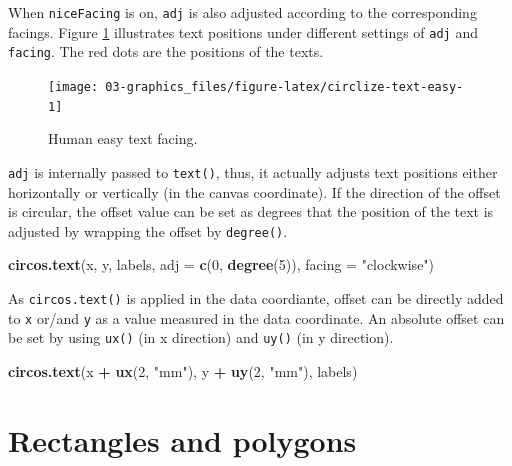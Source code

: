 \documentclass[]{book}
\newenvironment{Shaded}{\begin{snugshade}}{\end{snugshade}}
\newcommand{\KeywordTok}[1]{\textcolor[rgb]{0.13,0.29,0.53}{\textbf{#1}}}
\newcommand{\DataTypeTok}[1]{\textcolor[rgb]{0.13,0.29,0.53}{#1}}
\newcommand{\DecValTok}[1]{\textcolor[rgb]{0.00,0.00,0.81}{#1}}
\newcommand{\StringTok}[1]{\textcolor[rgb]{0.31,0.60,0.02}{#1}}
\newcommand{\OperatorTok}[1]{\textcolor[rgb]{0.81,0.36,0.00}{\textbf{#1}}}
\newcommand{\NormalTok}[1]{#1}
\theoremstyle{definition}
\theoremstyle{definition}
\theoremstyle{remark}
\begin{document}
When \texttt{niceFacing} is on, \texttt{adj} is also adjusted according
to the corresponding facings. Figure \ref{fig:circlize-text-easy}
illustrates text positions under different settings of \texttt{adj} and
\texttt{facing}. The red dots are the positions of the texts.

\begin{figure}

{\centering \texttt{[image: 03-graphics\_files/figure-latex/circlize-text-easy-1]} 

}

\caption{Human easy text facing.}\label{fig:circlize-text-easy}
\end{figure}

\texttt{adj} is internally passed to \texttt{text()}, thus, it actually
adjusts text positions either horizontally or vertically (in the canvas
coordinate). If the direction of the offset is circular, the offset
value can be set as degrees that the position of the text is adjusted by
wrapping the offset by \texttt{degree()}.

\begin{Shaded}
\begin{Highlighting}[]
\KeywordTok{circos.text}\NormalTok{(x, y, labels, }\DataTypeTok{adj =} \KeywordTok{c}\NormalTok{(}\DecValTok{0}\NormalTok{, }\KeywordTok{degree}\NormalTok{(}\DecValTok{5}\NormalTok{)), }\DataTypeTok{facing =} \StringTok{"clockwise"}\NormalTok{)}
\end{Highlighting}
\end{Shaded}

As \texttt{circos.text()} is applied in the data coordiante, offset can
be directly added to \texttt{x} or/and \texttt{y} as a value measured in
the data coordinate. An absolute offset can be set by using
\texttt{ux()} (in x direction) and \texttt{uy()} (in y direction).

\begin{Shaded}
\begin{Highlighting}[]
\KeywordTok{circos.text}\NormalTok{(x }\OperatorTok{+}\StringTok{ }\KeywordTok{ux}\NormalTok{(}\DecValTok{2}\NormalTok{, }\StringTok{"mm"}\NormalTok{), y }\OperatorTok{+}\StringTok{ }\KeywordTok{uy}\NormalTok{(}\DecValTok{2}\NormalTok{, }\StringTok{"mm"}\NormalTok{), labels)}
\end{Highlighting}
\end{Shaded}

\section{Rectangles and polygons}\label{rectangles}
\end{document}

